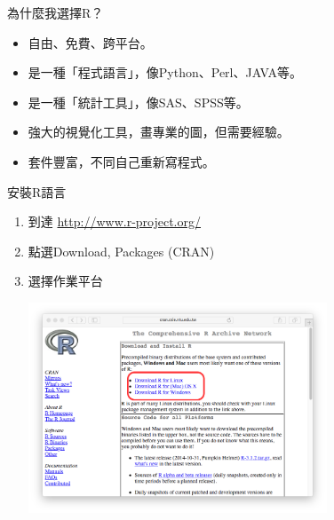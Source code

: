 \documentclass[12pt]{beamer}
\begin{document}
\begin{frame}{為什麼我選擇R？}
\begin{itemize}
\item 自由、免費、跨平台。
\item 是一種「程式語言」，像Python、Perl、JAVA等。
\item 是一種「統計工具」，像SAS、SPSS等。
\item 強大的視覺化工具，畫專業的圖，但需要經驗。
\item 套件豐富，不同自己重新寫程式。
\end{itemize}
\end{frame}

\begin{frame}[fragile]{安裝R語言}
\begin{enumerate}
\item 到達 \url{http://www.r-project.org/}
\item 點選Download, Packages (CRAN) \\
\item 選擇作業平台
	\begin{center}\includegraphics[width=0.7\textwidth]{downloadR.png}\end{center}
\end{enumerate}
\end{frame}
\end{document}

